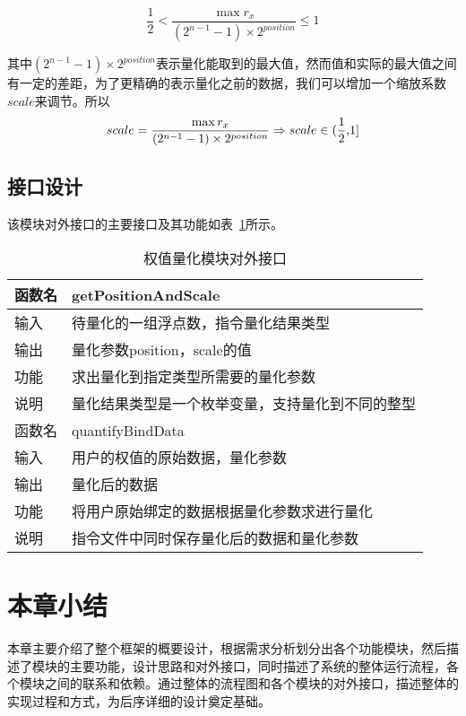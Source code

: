 \begin{equation}
 \frac{1}{2} < \frac {\max r_x}{{(2^{n-1} -1)} \times 2^{position}} \le 1  
\end{equation} 

其中${(2^{n-1} -1)} \times 2^{position}$表示量化能取到的最大值，然而值和实际的最大值之间有一定的差距，为了更精确的表示量化之前的数据，我们可以增加一个缩放系数$scale$来调节。所以 \\

\begin{equation}
 scale = \frac {\max r_x}{{(2^{n-1} -1)} \times 2^{position}} \Rightarrow scale \in (\frac{1}{2} \text, 1]
\end{equation} 

\subsection{接口设计}
该模块对外接口的主要接口及其功能如表~\ref{tab:weight-quant-tab}所示。

\begin{table}[htb]
  \centering\small
  \caption{权值量化模块对外接口}
  \label{tab:weight-quant-tab}
  \begin{tabular}{ll}
    \toprule
    函数名       & getPositionAndScale                \\
    \midrule
    输入 & 待量化的一组浮点数，指令量化结果类型           \\
    输出 & 量化参数position，scale的值                   \\
    功能 & 求出量化到指定类型所需要的量化参数              \\
    说明 & 量化结果类型是一个枚举变量，支持量化到不同的整型 \\
    \bottomrule
    \toprule
    函数名       & quantifyBindData              \\
    \midrule
    输入 & 用户的权值的原始数据，量化参数           \\
    输出 & 量化后的数据                            \\
    功能 & 将用户原始绑定的数据根据量化参数求进行量化 \\
    说明 & 指令文件中同时保存量化后的数据和量化参数   \\
    \bottomrule
  \end{tabular}
\end{table}

\section {本章小结}

本章主要介绍了整个框架的概要设计，根据需求分析划分出各个功能模块，然后描述了模块的主要功能，设计思路和对外接口，同时描述了系统的整体运行流程，各个模块之间的联系和依赖。通过整体的流程图和各个模块的对外接口，描述整体的实现过程和方式，为后序详细的设计奠定基础。